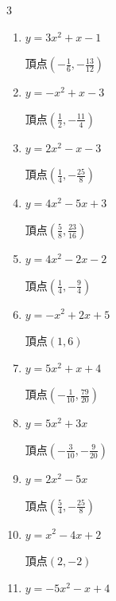 \begin{multicols}{3}
\begin{enumerate}
\columnbreak %

  \item $\displaystyle y=3x^{2}+x-1$

        $\displaystyle 頂点\left( -\frac{1}{6} , -\frac{13}{12} \right)$

  \item $\displaystyle y=-x^{2}+x-3$

        $\displaystyle 頂点\left( \frac{1}{2} , -\frac{11}{4} \right)$

  \item $\displaystyle y=2x^{2}-x-3$

        $\displaystyle 頂点\left( \frac{1}{4} , -\frac{25}{8} \right)$

  \item $\displaystyle y=4x^{2}-5x+3$

        $\displaystyle 頂点\left( \frac{5}{8} , \frac{23}{16} \right)$

  \item $\displaystyle y=4x^{2}-2x-2$

        $\displaystyle 頂点\left( \frac{1}{4} , -\frac{9}{4} \right)$

\columnbreak %

\resetques

  \item $\displaystyle y=-x^{2}+2x+5$

        $\displaystyle 頂点\left( 1 , 6 \right)$

  \item $\displaystyle y=5x^{2}+x+4$

        $\displaystyle 頂点\left( -\frac{1}{10} , \frac{79}{20} \right)$

  \item $\displaystyle y=5x^{2}+3x$

        $\displaystyle 頂点\left( -\frac{3}{10} , -\frac{9}{20} \right)$

  \item $\displaystyle y=2x^{2}-5x$

        $\displaystyle 頂点\left( \frac{5}{4} , -\frac{25}{8} \right)$

  \item $\displaystyle y=x^{2}-4x+2$

        $\displaystyle 頂点\left( 2 , -2 \right)$

\columnbreak %

  \item $\displaystyle y=-5x^{2}-x+4$


\end{enumerate}
\end{multicols}
